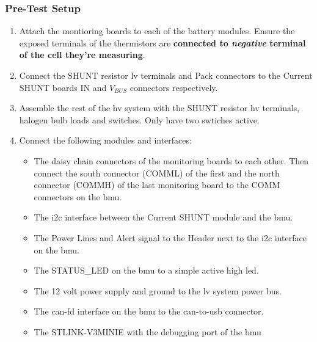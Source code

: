 \subsubsection{Pre-Test Setup}

\begin{enumerate}
	\item Attach the montioring boards to each of the battery modules. Ensure the exposed terminals of  the thermistors are \textbf{connected to \emph{negative} terminal of the cell they're measuring}.
	\item  Connect the SHUNT resistor \gls{lv} terminals and Pack connectors to the Current SHUNT boards IN and $V_{BUS}$ connectors respectively.
	\item Assemble the rest of the \gls{hv} system with the SHUNT resistor \gls{hv} terminals, halogen bulb loads and switches. Only have two swtiches active.
	\item Connect the following modules and interfaces:\begin{itemize}
		\item The daisy chain connectors of the monitoring boards to each other. Then connect the south connector (COMML) of the first and the north connector (COMMH) of the last monitoring board to the COMM connectors on the \gls{bmu}.
		\item The \gls{i2c} interface between the Current SHUNT module and the \gls{bmu}.
		\item The Power Lines and Alert signal to the Header next to the \gls{i2c} interface on the \gls{bmu}.
		\item The STATUS\_LED on the \gls{bmu} to a simple active high \gls{led}.
		\item The 12 volt power supply and ground to the \gls{lv} system power bus.
		\item The \gls{can-fd} interface on the \gls{bmu} to the \gls{can}-to-\gls{usb} connector.
		\item The STLINK-V3MINIE with the debugging port of the \gls{bmu}
	\end{itemize}
\end{enumerate}

